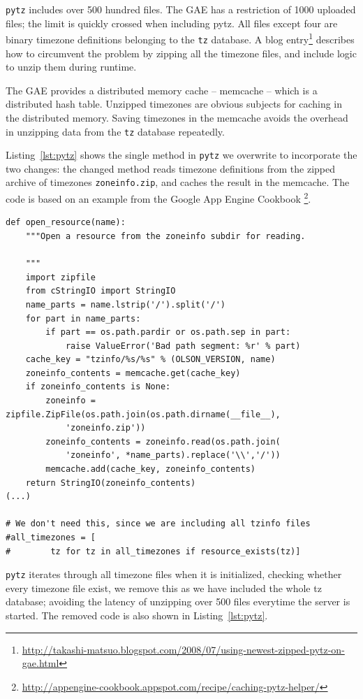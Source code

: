 \verb|pytz| includes over 500 hundred files. The GAE has a restriction of 1000
uploaded files; the limit is quickly crossed when including pytz. All files
except four are binary timezone definitions belonging to the \verb|tz|
database. A blog entry\footnote{\url{http://takashi-matsuo.blogspot.com/2008/07/using-newest-zipped-pytz-on-gae.html}}
describes how to circumvent the problem by zipping all the timezone files, and
include logic to unzip them during runtime.

The GAE provides a distributed memory cache -- memcache -- which is a distributed
hash table. Unzipped timezones are obvious subjects for caching in the
distributed memory. Saving timezones in the memcache avoids the overhead in
unzipping data from the \verb|tz| database repeatedly.

Listing~\ref{lst:pytz} shows the single method in \verb|pytz| we overwrite to
incorporate the two changes: the changed method reads timezone definitions from
the zipped archive of timezones \verb|zoneinfo.zip|, and caches the result in the
memcache. The code is based on an example from the Google App Engine Cookbook
\footnote{\url{http://appengine-cookbook.appspot.com/recipe/caching-pytz-helper/}}.

\begin{lstlisting}[caption=Altered pytz,label=lst:pytz]
def open_resource(name):
    """Open a resource from the zoneinfo subdir for reading.

    """
    import zipfile
    from cStringIO import StringIO
    name_parts = name.lstrip('/').split('/')
    for part in name_parts:
        if part == os.path.pardir or os.path.sep in part:
            raise ValueError('Bad path segment: %r' % part)
    cache_key = "tzinfo/%s/%s" % (OLSON_VERSION, name)
    zoneinfo_contents = memcache.get(cache_key)
    if zoneinfo_contents is None:
        zoneinfo = zipfile.ZipFile(os.path.join(os.path.dirname(__file__), 
            'zoneinfo.zip'))
        zoneinfo_contents = zoneinfo.read(os.path.join(
            'zoneinfo', *name_parts).replace('\\','/'))
        memcache.add(cache_key, zoneinfo_contents)
    return StringIO(zoneinfo_contents)
(...)

# We don't need this, since we are including all tzinfo files
#all_timezones = [
#        tz for tz in all_timezones if resource_exists(tz)]

\end{lstlisting}

\verb|pytz| iterates through all timezone files when it is initialized, checking
whether every timezone file exist, we remove this as we have included the whole
tz database; avoiding the latency of unzipping over 500 files everytime the
server is started. The removed code is also shown in Listing~\ref{lst:pytz}.

